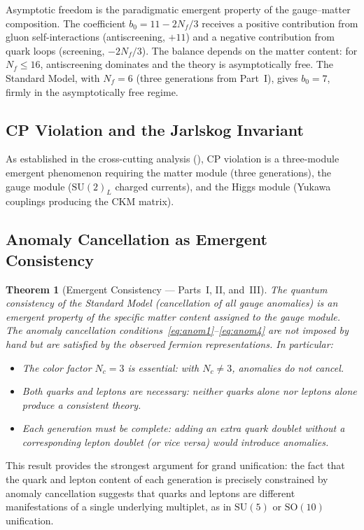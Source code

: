 \documentclass[12pt]{article}
\newtheorem{theorem}{Theorem}[section]
\theoremstyle{definition}
\theoremstyle{remark}
\newcommand{\su}[1]{\mathrm{SU}(#1)}
\begin{document}
Asymptotic freedom is the paradigmatic emergent property of the gauge--matter composition. The coefficient $b_0 = 11 - 2N_f/3$ receives a positive contribution from gluon self-interactions (antiscreening, $+11$) and a negative contribution from quark loops (screening, $-2N_f/3$). The balance depends on the matter content: for $N_f \leq 16$, antiscreening dominates and the theory is asymptotically free. The Standard Model, with $N_f = 6$ (three generations from Part~I), gives $b_0 = 7$, firmly in the asymptotically free regime.

\subsection{CP Violation and the Jarlskog Invariant}

As established in the cross-cutting analysis (), CP violation is a three-module emergent phenomenon requiring the matter module (three generations), the gauge module ($\su{2}_L$ charged currents), and the Higgs module (Yukawa couplings producing the CKM matrix).

\subsection{Anomaly Cancellation as Emergent Consistency}

\begin{theorem}[Emergent Consistency --- Parts~I, II, and~III]
\label{thm:emergent-consistency}
The quantum consistency of the Standard Model (cancellation of all gauge anomalies) is an emergent property of the specific matter content assigned to the gauge module. The anomaly cancellation conditions~\eqref{eq:anom1}--\eqref{eq:anom4} are not imposed by hand but are satisfied by the observed fermion representations. In particular:
\begin{itemize}
\item The color factor $N_c = 3$ is essential: with $N_c \neq 3$, anomalies do not cancel.
\item Both quarks and leptons are necessary: neither quarks alone nor leptons alone produce a consistent theory.
\item Each generation must be complete: adding an extra quark doublet without a corresponding lepton doublet (or vice versa) would introduce anomalies.
\end{itemize}
\end{theorem}

This result provides the strongest argument for grand unification: the fact that the quark and lepton content of each generation is precisely constrained by anomaly cancellation suggests that quarks and leptons are different manifestations of a single underlying multiplet, as in $\su{5}$ or $\mathrm{SO}(10)$ unification.
\end{document}

